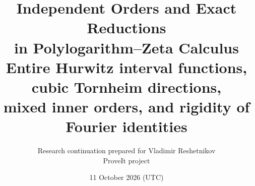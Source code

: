 
\title{Independent Orders and Exact Reductions\\in Polylogarithm--Zeta Calculus\\[7pt]
\large Entire Hurwitz interval functions, cubic Tornheim directions,\\mixed inner orders, and rigidity of Fourier identities}
\author{Research continuation prepared for Vladimir Reshetnikov\\\small ProveIt project}
\date{11 October 2026 (UTC)}

\maketitle

\clearpage
\tableofcontents
\clearpage









